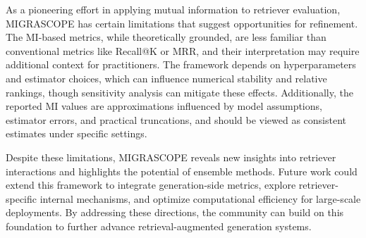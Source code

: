 \documentclass{article}
\theoremstyle{plain}
\theoremstyle{definition}
\theoremstyle{remark}
\begin{document}
As a pioneering effort in applying mutual information to retriever evaluation, MIGRASCOPE has certain limitations that suggest opportunities for refinement. The MI-based metrics, while theoretically grounded, are less familiar than conventional metrics like Recall@K or MRR, and their interpretation may require additional context for practitioners. The framework depends on hyperparameters and estimator choices, which can influence numerical stability and relative rankings, though sensitivity analysis can mitigate these effects. Additionally, the reported MI values are approximations influenced by model assumptions, estimator errors, and practical truncations, and should be viewed as consistent estimates under specific settings.

Despite these limitations, MIGRASCOPE reveals new insights into retriever interactions and highlights the potential of ensemble methods. Future work could extend this framework to integrate generation-side metrics, explore retriever-specific internal mechanisms, and optimize computational efficiency for large-scale deployments. By addressing these directions, the community can build on this foundation to further advance retrieval-augmented generation systems.






\end{document}
